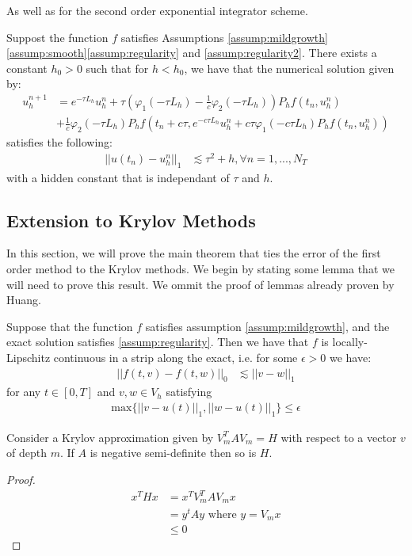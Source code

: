 As well as for the second order exponential integrator scheme.
\begin{theorem}\label{theorem:standard2}
    Suppost the function $f$ satisfies Assumptions \ref{assump:mildgrowth}\ref{assump:smooth}\ref{assump:regularity} and \ref{assump:regularity2}.
    There exists a constant $h_0 > 0$ such that for $h<h_0$, we have that the numerical solution given by:
    \begin{align*}
        u_h^{n+1} &= e^{-\tau L_h}u_h^n + \tau (\varphi_1(-\tau L_h) - \frac{1}{c}\varphi_2(-\tau L_h))P_hf(t_n,u_h^n)\\
        &+\frac{1}{c}\varphi_2(-\tau L_h)P_hf(t_n + c\tau,e^{-c\tau L_h}u_h^n + c\tau\varphi_1(-c\tau L_h)P_hf(t_n,u_h^n))
    \end{align*}
    satisfies the following:
    \begin{align*}
        ||u(t_n) - u_h^n||_1 &\lesssim \tau^2 + h, \forall n =1,...,N_T
    \end{align*}
    with a hidden constant that is independant of $\tau$ and $h$.
\end{theorem}

\subsection{Extension to Krylov Methods}

In this section, we will prove the main theorem that ties the error of the first order method to the Krylov methods.
We begin by stating some lemma that we will need to prove this result.
We ommit the proof of lemmas already proven by Huang\cite{Huang2022}.

\begin{lemma} \label{lemma:Lipschitz}
    Suppose that the function $f$ satisfies assumption \ref{assump:mildgrowth}, and the exact solution satisfies \ref{assump:regularity}.
    Then we have that $f$ is locally-Lipschitz continuous in a strip along the exact, i.e. for some $\epsilon > 0$ we have:
    \begin{align*}
        ||f(t,v) - f(t,w)||_0 &\lesssim ||v-w||_1
    \end{align*}
    for any $t\in [0,T]$ and $v,w \in V_h$ satisfying
    \begin{align*}
        \text{max}\{||v-u(t)||_1,||w-u(t)||_1\}\leq \epsilon
    \end{align*}
\end{lemma}

\begin{lemma}
    Consider a Krylov approximation given by $V_m^TAV_m = H$ with respect to a vector $v$ of depth $m$.
    If $A$ is negative semi-definite then so is $H$.
\end{lemma}
\begin{proof}
    \begin{align*}
        x^T Hx &= x^T V_m^TAV_mx\\
        &= y^tAy \text{ where $y = V_mx$}\\
        &\leq 0
    \end{align*}
\end{proof}

